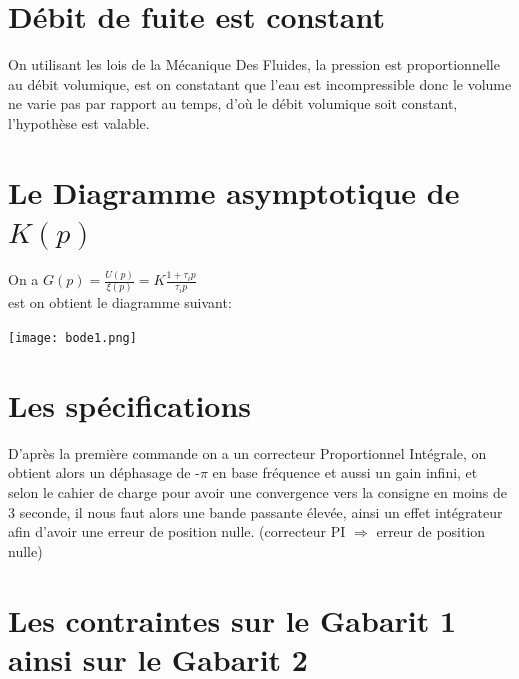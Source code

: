 \documentclass[12pt, a4paper, openany]{report}
\begin{document}
   
  
 \section{Débit de fuite est constant}  %
 
 
 On utilisant les lois de la Mécanique Des Fluides, la pression est proportionnelle au débit volumique, est on constatant que l'eau est incompressible donc le volume ne varie pas par rapport au temps, d’où le débit volumique soit constant, l'hypothèse est valable. 
 
 
 \section{Le Diagramme asymptotique de $K(p)$ }  %
 
 On a  $G(p)=\frac {U(p)}{\xi(p)}=K\frac {1+\tau_{i}p}{\tau_{i}p}$\\
 
 est on obtient le diagramme suivant:\\
 
 \begin{center}
    \texttt{[image: bode1.png]}
    \label{fig2}
   \end{center}
 
 
 \section{Les spécifications} %

 D’après la première commande on a un correcteur Proportionnel Intégrale, on obtient alors un déphasage de -$\pi$ en base fréquence et aussi un gain infini, et selon le cahier de charge pour avoir une convergence vers la consigne en moins de 3 seconde, il nous faut alors une bande passante élevée, ainsi un effet intégrateur afin d'avoir une erreur de position nulle. (correcteur PI $\Rightarrow$ erreur de position nulle)
 
 
 \section{Les contraintes sur le Gabarit 1 ainsi sur le Gabarit 2}  %
 
\end{document}
